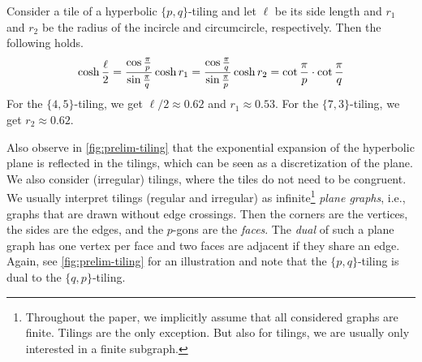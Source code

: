 \begin{lemma}
    \label{lem:distances-in-tilings}
    Consider a tile of a hyperbolic $\{p, q\}$-tiling and let $\ell$ be its side length and $r_1$ and $r_2$ be the radius of the incircle and circumcircle, respectively.
    Then the following holds.
    \begin{equation*}
        \cosh \frac{\ell}{2} = \frac{\cos \frac{\pi}{p}}{\sin \frac{\pi}{q}}
        \hfill
        \cosh r_1 = \frac{\cos \frac{\pi}{q}}{\sin \frac{\pi}{p}}
        \hfill
        \cosh r_2 = \cot \frac{\pi}{p} \cdot \cot \frac{\pi}{q}
        \hfill
    \end{equation*}
    For the $\{4, 5\}$-tiling, we get $\ell / 2 \approx 0.62$ and $r_1 \approx 0.53$.
    For the $\{7, 3\}$-tiling, we get $r_2 \approx 0.62$.
\end{lemma}
%
Also observe in \cref{fig:prelim-tiling} that the exponential expansion of the hyperbolic plane is reflected in the tilings, which can be seen as a discretization of the plane.
We also consider (irregular) tilings, where the tiles do not need to be congruent.
%
We usually interpret tilings (regular and irregular) as infinite\footnote{Throughout the paper, we implicitly assume that all considered graphs are finite.
  Tilings are the only exception.
  But also for tilings, we are usually only interested in a finite subgraph.} \emph{plane graphs}, i.e., graphs that are drawn without edge crossings.
Then the corners are the vertices, the sides are the edges, and the $p$-gons are the \emph{faces}.
The \emph{dual} of such a plane graph has one vertex per face and two faces are adjacent if they share an edge.
Again, see \cref{fig:prelim-tiling} for an illustration and note that the $\{p, q\}$-tiling is dual to the $\{q, p\}$-tiling.
%

